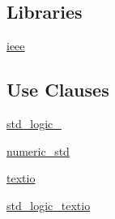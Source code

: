 \subsection*{Libraries}
 \begin{DoxyCompactItemize}
\item 
\hyperlink{classautomatic__tb_a0a6af6eef40212dbaf130d57ce711256}{ieee} 
\end{DoxyCompactItemize}
\subsection*{Use Clauses}
 \begin{DoxyCompactItemize}
\item 
\hyperlink{classautomatic__tb_acd03516902501cd1c7296a98e22c6fcb}{std\+\_\+logic\+\_}   
\item 
\hyperlink{classautomatic__tb_a2edc34402b573437d5f25fa90ba4013e}{numeric\+\_\+std}   
\item 
\hyperlink{classautomatic__tb_aa8c4e25998323a84db5b1fa701b92fcb}{textio}   
\item 
\hyperlink{classautomatic__tb_abc7d7fc2675847e1d861e3fda2b1990c}{std\+\_\+logic\+\_\+textio}   
\end{DoxyCompactItemize}


